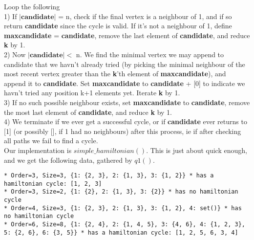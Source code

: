 \documentclass[10pt,a4paper]{report}
\begin{document}
Loop the following \\

1) If $|\textbf{candidate}|$ = n, check if the final vertex is a neighbour of 1, and if so return \textbf{candidate} since the cycle is valid. If it's not a neighbour of 1, define \textbf{maxcandidate} = \textbf{candidate}, remove the last element of \textbf{candidate}, and reduce \textbf{k} by 1.\\

2) Now $|\textbf{candidate}|<$ n. We find the minimal vertex we may append to candidate that we havn't already tried (by picking the minimal neighbour of the most recent vertex greater than the \textbf{k}'th element of \textbf{maxcandidate}), and append it to \textbf{candidate}. Set \textbf{maxcandidate} to \textbf{candidate} + [0] to indicate we havn't tried any position k+1 elements yet. Iterate \textbf{k} by 1.\\

3) If no such possible neighbour exists, set \textbf{maxcandidate} to \textbf{candidate}, remove the most last element of \textbf{candidate}, and reduce \textbf{k} by 1. \\

4) We terminate if we ever get a successful cycle, or if \textbf{candidate} ever returns to [1] (or possibly [], if 1 had no neighbours) after this process, ie if after checking all paths we fail to find a cycle. \\

Our implementation is $simple\_hamiltonian()$. This is just about quick enough, and we get the following data, gathered by $q1()$. 

\begin{lstlisting}[breaklines]
* Order=3, Size=3, {1: {2, 3}, 2: {1, 3}, 3: {1, 2}} * has a hamiltonian cycle: [1, 2, 3]
* Order=3, Size=2, {1: {2}, 2: {1, 3}, 3: {2}} * has no hamiltonian cycle
* Order=4, Size=3, {1: {2, 3}, 2: {1, 3}, 3: {1, 2}, 4: set()} * has no hamiltonian cycle
* Order=6, Size=8, {1: {2, 4}, 2: {1, 4, 5}, 3: {4, 6}, 4: {1, 2, 3}, 5: {2, 6}, 6: {3, 5}} * has a hamiltonian cycle: [1, 2, 5, 6, 3, 4]
\end{lstlisting}
\end{document}
